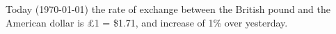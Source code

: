 \documentclass{article}
\begin{document}
Today (\today) the rate of exchange between the British
pound and the American dollar is \pounds 1 = \$1.71, and
increase of 1\% over yesterday.
\end{document}
